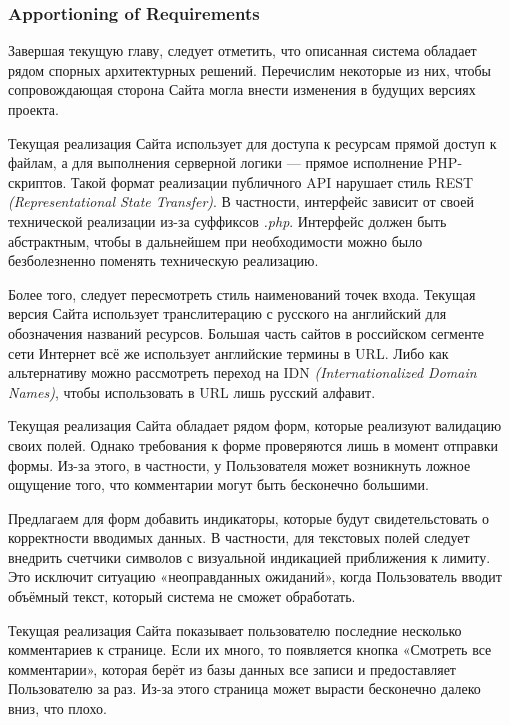 \subsubsection{Apportioning of Requirements}

Завершая текущую главу, следует отметить, что описанная система обладает рядом спорных архитектурных решений. Перечислим некоторые из них, чтобы сопровождающая сторона Сайта могла внести изменения в будущих версиях проекта.


Текущая реализация Сайта использует для доступа к ресурсам прямой доступ к файлам, а для выполнения серверной логики --- прямое исполнение PHP-скриптов. Такой формат реализации публичного API нарушает стиль REST \textit{(Representational State Transfer)}. В частности, интерфейс зависит от своей технической реализации из-за суффиксов \textit{.php}. Интерфейс должен быть абстрактным, чтобы в дальнейшем при необходимости можно было безболезненно поменять техническую реализацию.

Более того, следует пересмотреть стиль наименований точек входа. Текущая версия Сайта использует транслитерацию с русского на английский для обозначения названий ресурсов. Большая часть сайтов в российском сегменте сети Интернет всё же использует английские термины в URL. Либо как альтернативу можно рассмотреть переход на IDN \textit{(Internationalized Domain Names)}, чтобы использовать в URL лишь русский алфавит.


Текущая реализация Сайта обладает рядом форм, которые реализуют валидацию своих полей. Однако требования к форме проверяются лишь в момент отправки формы. Из-за этого, в частности, у Пользователя может возникнуть ложное ощущение того, что комментарии могут быть бесконечно большими.

Предлагаем для форм добавить индикаторы, которые будут свидетельстовать о корректности вводимых данных. В частности, для текстовых полей следует внедрить счетчики символов с визуальной индикацией приближения к лимиту. Это исключит ситуацию «неоправданных ожиданий», когда Пользователь вводит объёмный текст, который система не сможет обработать.


Текущая реализация Сайта показывает пользователю последние несколько комментариев к странице. Если их много, то появляется кнопка «Смотреть все комментарии», которая берёт из базы данных все записи и предоставляет Пользователю за раз. Из-за этого страница может вырасти бесконечно далеко вниз, что плохо.

